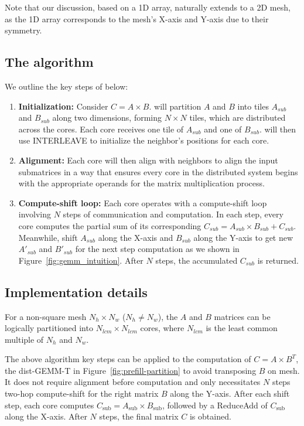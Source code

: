 Note that our discussion, based on a 1D array, naturally extends to a 2D mesh, as the 1D array corresponds to the mesh's X-axis and Y-axis due to their symmetry.

\vspace{-0.3cm}
\subsection{The \gemm algorithm} \label{subsec:meshgemm} 

We outline the key steps of \gemm below:

\begin{enumerate}[label=(\arabic*), leftmargin=0.5cm, noitemsep,topsep=0pt]
\item \textbf{Initialization:} Consider $C = A \times B$. \gemm will partition $A$ and $B$ into tiles $A_{sub}$ and $B_{sub}$ along two dimensions, forming $N \times N$ tiles, which are distributed across the cores. Each core receives one tile of $A_{sub}$ and one of $B_{sub}$. \gemm will then use INTERLEAVE to initialize the neighbor's positions for each core. 

\item \textbf{Alignment:}  
Each core will then align with neighbors to align the input submatrices in a way that ensures every core in the distributed system begins with the appropriate operands for the matrix multiplication process. 

\item \textbf{Compute-shift loop:}  
Each core operates with a compute-shift loop involving $N$ steps of communication and computation. In each step, every core computes the partial sum of its corresponding $C_{sub} = A_{sub} \times B_{sub} + C_{sub}$. Meanwhile, shift $A_{sub}$ along the X-axis and $B_{sub}$ along the Y-axis to get new $A'_{sub}$ 
 and $B'_{sub}$ for the next step computation as  we shown in Figure~\ref{fig:gemm_intuition}. After $N$ steps, the accumulated $C_{sub}$ is returned.
\end{enumerate}

\vspace{-0.3cm}
\subsection{Implementation details}

 For a non-square mesh $N_h \times N_w$ ($N_h \neq N_w$), the $A$ and $B$ matrices can be logically partitioned into $N_{lcm} \times N_{lcm}$ cores, where $N_{lcm}$ is the least common multiple of $N_h$ and $N_w$.

 The above algorithm key steps can be applied to the computation of $C = A \times B^T$, the dist-GEMM-T in Figure~\ref{fig:prefill-partition} to avoid transposing $B$ on mesh. It does not require alignment before computation and only necessitates $N$ steps two-hop compute-shift for the right matrix $B$ along the Y-axis. After each shift step, each core computes $C_{\text{sub}} = A_{\text{sub}} \times B_{\text{sub}}$, followed by a ReduceAdd of $C_{\text{sub}}$ along the X-axis. After $N$ steps, the final matrix $C$ is obtained.